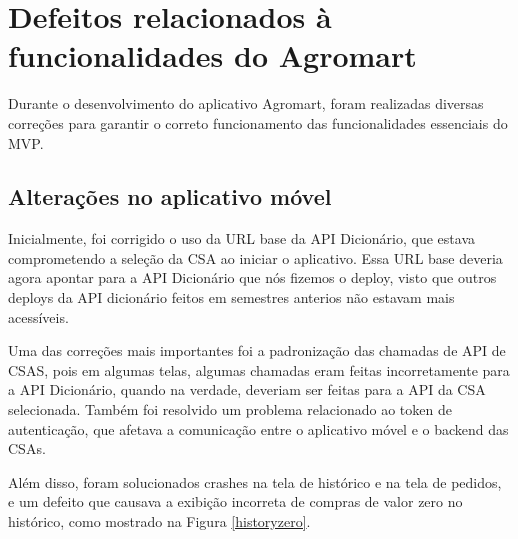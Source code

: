 \section{Defeitos relacionados à funcionalidades do Agromart}
Durante o desenvolvimento do aplicativo Agromart, foram realizadas diversas correções para garantir o correto funcionamento das funcionalidades essenciais do MVP.

\subsection{Alterações no aplicativo móvel}

Inicialmente, foi corrigido o uso da URL base da API Dicionário, que estava comprometendo a seleção da CSA ao iniciar o aplicativo. Essa URL base deveria agora apontar para a API Dicionário que nós fizemos o deploy, visto que outros deploys da API dicionário feitos em semestres anterios não estavam mais acessíveis.

Uma das correções mais importantes foi a padronização das chamadas de API de CSAS, pois em algumas telas, algumas chamadas eram feitas incorretamente para a API Dicionário, quando na verdade, deveriam ser feitas para a API da CSA selecionada. Também foi resolvido um problema relacionado ao token de autenticação, que afetava a comunicação entre o aplicativo móvel e o backend das CSAs.

Além disso, foram solucionados crashes na tela de histórico e na tela de pedidos, e um defeito que causava a exibição incorreta de compras de valor zero no histórico, como mostrado na Figura \ref{historyzero}.

